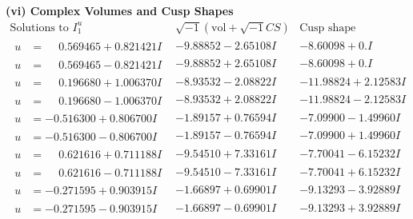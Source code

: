 \documentclass[1p]{elsarticle_modified}
\theoremstyle{definition}
\newcommand{\I}{\sqrt{-1}}
\begin{document}
\newpage\flushleft \textbf{(vi) Complex Volumes and Cusp Shapes}
$$\begin{array}{c|c|c}  
\text{Solutions to }I^u_{1}& \I (\text{vol} + \sqrt{-1}CS) & \text{Cusp shape}\\
 \hline 
\begin{aligned}
u &= \phantom{-}0.569465 + 0.821421 I\end{aligned}
 & -9.88852 - 2.65108 I & -8.60098 + 0. I\phantom{ +0.000000I} \\ \hline\begin{aligned}
u &= \phantom{-}0.569465 - 0.821421 I\end{aligned}
 & -9.88852 + 2.65108 I & -8.60098 + 0. I\phantom{ +0.000000I} \\ \hline\begin{aligned}
u &= \phantom{-}0.196680 + 1.006370 I\end{aligned}
 & -8.93532 - 2.08822 I & -11.98824 + 2.12583 I \\ \hline\begin{aligned}
u &= \phantom{-}0.196680 - 1.006370 I\end{aligned}
 & -8.93532 + 2.08822 I & -11.98824 - 2.12583 I \\ \hline\begin{aligned}
u &= -0.516300 + 0.806700 I\end{aligned}
 & -1.89157 + 0.76594 I & -7.09900 - 1.49960 I \\ \hline\begin{aligned}
u &= -0.516300 - 0.806700 I\end{aligned}
 & -1.89157 - 0.76594 I & -7.09900 + 1.49960 I \\ \hline\begin{aligned}
u &= \phantom{-}0.621616 + 0.711188 I\end{aligned}
 & -9.54510 + 7.33161 I & -7.70041 - 6.15232 I \\ \hline\begin{aligned}
u &= \phantom{-}0.621616 - 0.711188 I\end{aligned}
 & -9.54510 - 7.33161 I & -7.70041 + 6.15232 I \\ \hline\begin{aligned}
u &= -0.271595 + 0.903915 I\end{aligned}
 & -1.66897 + 0.69901 I & -9.13293 - 3.92889 I \\ \hline\begin{aligned}
u &= -0.271595 - 0.903915 I\end{aligned}
 & -1.66897 - 0.69901 I & -9.13293 + 3.92889 I \\ \hline\begin{aligned}

\end{aligned}
\end{array}$$
\end{document}
